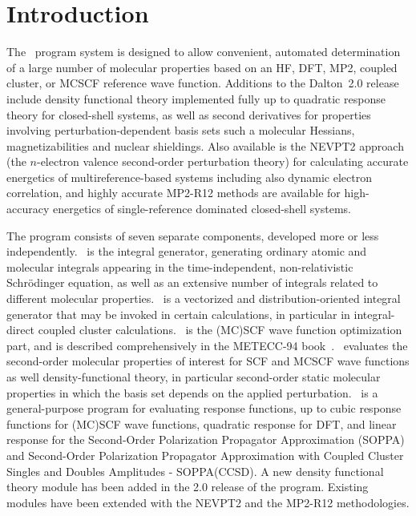\chapter{Introduction}\label{ch:intro}

The \dalton\ program system is designed to allow convenient,
automated determination of a large number of molecular properties
based on an HF, DFT, MP2, coupled cluster, or MCSCF reference wave
function. Additions to the Dalton~2.0 release include
density functional theory implemented fully up to quadratic response
theory for closed-shell systems, as well as second derivatives for
properties involving perturbation-dependent basis sets such a
molecular Hessians, magnetizabilities and nuclear shieldings. Also
available is the NEVPT2 approach
(the $n$-electron valence second-order perturbation theory) for
calculating  accurate energetics of
multireference-based systems including also dynamic electron
correlation, and highly accurate MP2-R12
 methods are available for high-accuracy energetics of
single-reference dominated closed-shell systems.

 The program consists
of seven separate components, developed more or less independently.
\her\ is the integral generator, generating ordinary
atomic and molecular integrals appearing
in the time-independent, non-relativistic Schr\"{o}dinger
equation, as well as an extensive number of integrals related to
different molecular properties. \eri\ is a vectorized and
distribution-oriented integral generator that may be invoked in
certain calculations, in particular in integral-direct coupled cluster
calculations. \sir\ is the (MC)SCF wave function 
optimization part, and is described comprehensively in the
METECC-94 book~\cite{hjajhajomotecc}. \aba\ evaluates the
second-order molecular properties of interest for SCF and MCSCF wave
functions as well density-functional theory, in particular second-order static molecular properties in
which the basis set depends on the applied perturbation. \resp\ is a
general-purpose program for evaluating response functions, up to cubic
response functions for (MC)SCF wave functions, quadratic response for DFT, and linear response for
the Second-Order Polarization Propagator Approximation (SOPPA) and Second-Order
Polarization Propagator Approximation with Coupled Cluster Singles and Doubles
Amplitudes - SOPPA(CCSD). A new density functional theory module has
been added in the 2.0 release of the program. Existing modules have
been extended with the NEVPT2 and the MP2-R12 methodologies.

